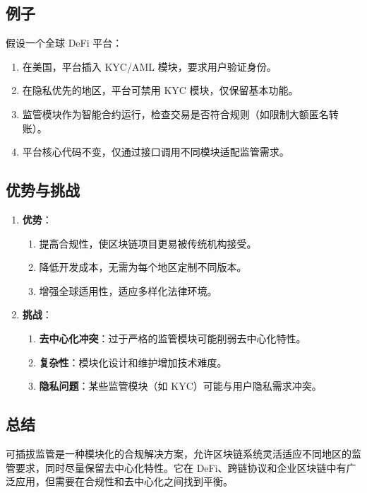 \documentclass[12pt]{ctexart}
\begin{document}
\subsection{例子}
假设一个全球 DeFi 平台：
\begin{enumerate}
    \item 在美国，平台插入 KYC/AML 模块，要求用户验证身份。
    \item 在隐私优先的地区，平台可禁用 KYC 模块，仅保留基本功能。
    \item 监管模块作为智能合约运行，检查交易是否符合规则（如限制大额匿名转账）。
    \item 平台核心代码不变，仅通过接口调用不同模块适配监管需求。
\end{enumerate}

\subsection{优势与挑战}
\begin{enumerate}
    \item \textbf{优势}：
        \begin{enumerate}
            \item 提高合规性，使区块链项目更易被传统机构接受。
            \item 降低开发成本，无需为每个地区定制不同版本。
            \item 增强全球适用性，适应多样化法律环境。
        \end{enumerate}
    \item \textbf{挑战}：
        \begin{enumerate}
            \item \textbf{去中心化冲突}：过于严格的监管模块可能削弱去中心化特性。
            \item \textbf{复杂性}：模块化设计和维护增加技术难度。
            \item \textbf{隐私问题}：某些监管模块（如 KYC）可能与用户隐私需求冲突。
        \end{enumerate}
\end{enumerate}

\subsection{总结}
可插拔监管是一种模块化的合规解决方案，允许区块链系统灵活适应不同地区的监管要求，同时尽量保留去中心化特性。它在 DeFi、跨链协议和企业区块链中有广泛应用，但需要在合规性和去中心化之间找到平衡。
\end{document}
